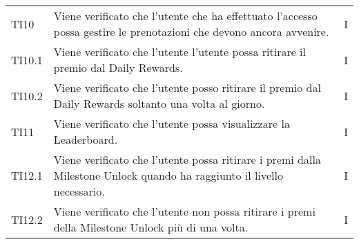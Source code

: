 \begin{longtable}{ >{\centering}p{} >{\centering}p{} >{\centering}p{}
			}
TI10&Viene verificato che l'utente che ha effettuato l'accesso possa gestire le prenotazioni che devono ancora avvenire. & I  \tabularnewline

TI10.1&Viene verificato che l'utente l'utente possa ritirare il premio dal Daily Rewards. & I  \tabularnewline

TI10.2&Viene verificato che l'utente posso ritirare il premio dal Daily Rewards soltanto una volta al giorno. & I  \tabularnewline

TI11&Viene verificato che l'utente possa visualizzare la Leaderboard. & I  \tabularnewline

TI12.1&Viene verificato che l'utente possa ritirare i premi dalla Milestone Unlock quando ha raggiunto il livello necessario. & I  \tabularnewline
TI12.2 &Viene verificato che l'utente non possa ritirare i premi della Milestone Unlock più di una volta. & I  \tabularnewline

\end{longtable}		